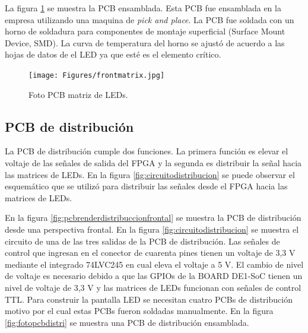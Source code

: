 La figura \ref{fig:fotomatrixled} se muestra la PCB ensamblada. Esta PCB fue ensamblada en la empresa utilizando una maquina de \textit{pick and place}. La PCB fue soldada con un horno de soldadura para componentes de montaje superficial (Surface Mount Device, SMD). La curva de temperatura del horno se ajustó de acuerdo a las hojas de datos de el LED ya que esté es el elemento crítico.

\begin{figure}[htpb]
	\centering
    \texttt{[image: Figures/frontmatrix.jpg]} 
	\caption{Foto PCB matriz de LEDs.}
	\label{fig:fotomatrixled}
\end{figure}



\subsection{PCB de distribución}
La PCB de distribución cumple dos funciones. La primera función es elevar el voltaje de las señales de salida del FPGA y la segunda es distribuir la señal hacia las matrices de LEDs. En la figura \ref{fig:circuitodistribucion} se puede observar el esquemático que se utilizó para distribuir las señales desde el FPGA hacia las matrices de LEDs. 

En la figura \ref{fig:pcbrenderdistribuccionfrontal}  se muestra la PCB de distribución desde una perspectiva frontal. En la figura \ref{fig:circuitodistribucion} se muestra el circuito de una de las tres salidas de la PCB de distribución. Las señales de control que ingresan en el conector de cuarenta pines tienen un voltaje de 3,3 V mediante el integrado 74LVC245 en cual eleva el voltaje a 5 V. El cambio de nivel de voltaje es necesario debido a que las GPIOs de la BOARD DE1-SoC tienen un nivel de voltaje de 3,3 V y las matrices de LEDs funcionan con señales de control TTL. Para construir la pantalla LED se necesitan cuatro PCBs de distribución motivo por el cual estas PCBs fueron soldadas manualmente. En la figura \ref{fig:fotopcbdistri} se muestra una PCB de distribución ensamblada. 


